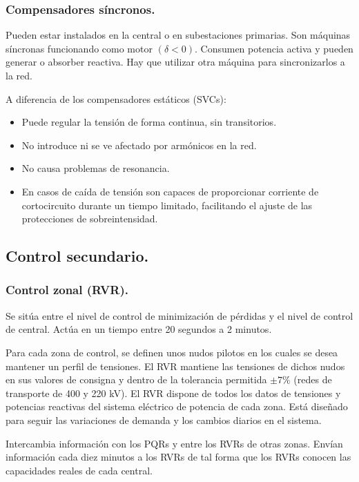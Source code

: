 			\subsubsection{Compensadores síncronos.}
				Pueden estar instalados en la central o en subestaciones primarias. Son máquinas síncronas funcionando como motor $(\delta < 0)$. Consumen potencia activa y pueden generar o absorber reactiva. Hay que utilizar otra máquina para sincronizarlos a la red.
				
				
				A diferencia de los compensadores estáticos (SVCs):
				\begin{itemize}
					\item Puede regular la tensión de forma continua, sin transitorios.
					\item No introduce ni se ve afectado por armónicos en la red.
					\item No causa problemas de resonancia.
					\item En casos de caída de tensión son capaces de proporcionar corriente de cortocircuito durante un tiempo limitado, facilitando el ajuste de las protecciones de sobreintensidad.
				\end{itemize}
				
		\subsection{Control secundario.}
		\subsubsection{Control zonal (RVR).}
			Se sitúa entre el nivel de control de minimización de pérdidas y el nivel de control de central. Actúa en un tiempo entre 20 segundos a 2 minutos.
			
			
			Para cada zona de control, se definen unos nudos pilotos en los cuales se desea mantener un perfil de tensiones. El RVR mantiene las tensiones de dichos nudos en sus valores de consigna y dentro de la tolerancia permitida $\pm7\%$ (redes de transporte de 400 y 220 kV). El RVR dispone de todos los datos de tensiones y potencias reactivas del sistema eléctrico de potencia de cada zona. Está diseñado para seguir las variaciones de demanda y los cambios diarios en el sistema.
			
			
			Intercambia información con los PQRs y entre los RVRs de otras zonas. Envían información cada diez minutos a los RVRs de tal forma que los RVRs conocen las capacidades reales de cada central.
			
